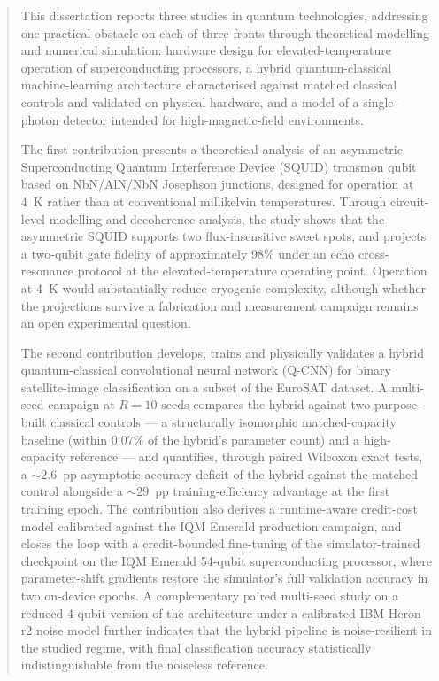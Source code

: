 \begin{abstract}
This dissertation reports three studies in quantum technologies, addressing one practical obstacle on each of three fronts through theoretical modelling and numerical simulation: hardware design for elevated-temperature operation of superconducting processors, a hybrid quantum-classical machine-learning architecture characterised against matched classical controls and validated on physical hardware, and a model of a single-photon detector intended for high-magnetic-field environments.

The first contribution presents a theoretical analysis of an asymmetric Superconducting Quantum Interference Device (SQUID) transmon qubit based on \mbox{NbN}/\allowbreak\mbox{AlN}/\allowbreak\mbox{NbN} Josephson junctions, designed for operation at 4~K rather than at conventional millikelvin temperatures. Through circuit-level modelling and decoherence analysis, the study shows that the asymmetric SQUID supports two flux-insensitive sweet spots, and projects a two-qubit gate fidelity of approximately 98\% under an echo cross-resonance protocol at the elevated-temperature operating point. Operation at 4~K would substantially reduce cryogenic complexity, although whether the projections survive a fabrication and measurement campaign remains an open experimental question.

The second contribution develops, trains and physically validates a hybrid quantum-classical convolutional neural network (Q-CNN) for binary satellite-image classification on a subset of the EuroSAT dataset. A multi-seed campaign at $R=10$ seeds compares the hybrid against two purpose-built classical controls --- a structurally isomorphic matched-capacity baseline (within $0.07\%$ of the hybrid's parameter count) and a high-capacity reference --- and quantifies, through paired Wilcoxon exact tests, a $\sim 2.6$~pp asymptotic-accuracy deficit of the hybrid against the matched control alongside a $\sim 29$~pp training-efficiency advantage at the first training epoch. The contribution also derives a runtime-aware credit-cost model calibrated against the IQM Emerald production campaign, and closes the loop with a credit-bounded fine-tuning of the simulator-trained checkpoint on the IQM Emerald 54-qubit superconducting processor, where parameter-shift gradients restore the simulator's full validation accuracy in two on-device epochs. A complementary paired multi-seed study on a reduced 4-qubit version of the architecture under a calibrated IBM Heron r2 noise model further indicates that the hybrid pipeline is noise-resilient in the studied regime, with final classification accuracy statistically indistinguishable from the noiseless reference.


\end{abstract}
